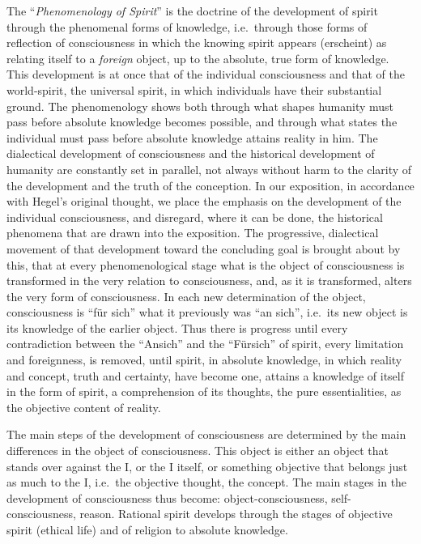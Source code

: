 The ``\emph{Phenomenology of Spirit}'' is the doctrine of the
development of spirit through the phenomenal forms of knowledge, i.e.\
through those forms of reflection of consciousness in which the knowing
spirit appears (erscheint) as relating itself to a \emph{foreign}
object, up to the absolute, true form of knowledge. This development is
at once that of the individual consciousness and that of the
world-spirit, the universal spirit, in which individuals have their
substantial ground. The phenomenology shows both through what shapes
humanity must pass before absolute knowledge becomes possible, and
through what states the individual must pass before absolute knowledge
attains reality in him. The dialectical development of consciousness and
the historical development of humanity are constantly set in parallel,
not always without harm to the clarity of the development and the truth
of the conception. In our exposition, in accordance with Hegel's
original thought, we place the emphasis on the development of the
individual consciousness, and disregard, where it can be done, the
historical phenomena that are drawn into the exposition. The
progressive, dialectical movement of that development toward
the concluding goal is brought about by this, that at every
phenomenological stage what is the object of consciousness is
transformed in the very relation to consciousness, and, as it is
transformed, alters the very form of consciousness. In each new
determination of the object, consciousness is ``für sich'' what it
previously was ``an sich'', i.e.\ its new object is its knowledge of
the earlier object. Thus there is progress until every contradiction
between the ``Ansich'' and the ``Fürsich'' of spirit, every limitation
and foreignness, is removed, until spirit, in absolute knowledge, in
which reality and concept, truth and certainty, have become one, attains
a knowledge of itself in the form of spirit, a comprehension of its
thoughts, the pure essentialities, as the objective content of reality.

The main steps of the development of consciousness are determined by
the main differences in the object of consciousness. This object is
either an object that stands over against the I, or the I itself, or
something objective that belongs just as much to the I, i.e.\ the
objective thought, the concept. The main stages in the development of
consciousness thus become: object-consciousness, self-consciousness,
reason. Rational spirit develops through the stages of objective spirit
(ethical life) and of religion to absolute knowledge.

